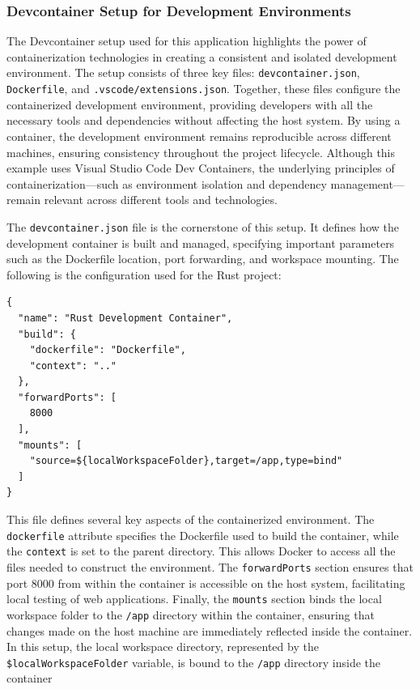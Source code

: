 \subsubsection{Devcontainer Setup for Development Environments}

The Devcontainer setup used for this application highlights the power of
containerization technologies in creating a consistent and isolated development
environment. The setup consists of three key files: \texttt{devcontainer.json},
\texttt{Dockerfile}, and \texttt{.vscode/extensions.json}. Together, these files
configure the containerized development environment, providing developers with all
the necessary tools and dependencies without affecting the host system. By using a
container, the development environment remains reproducible across different machines,
ensuring consistency throughout the project lifecycle. Although this example uses
Visual Studio Code Dev Containers, the underlying principles of containerization—such
as environment isolation and dependency management—remain relevant across different
tools and technologies.

The \texttt{devcontainer.json} file is the cornerstone of this setup. It defines
how the development container is built and managed, specifying important parameters
such as the Dockerfile location, port forwarding, and workspace mounting. The following
is the configuration used for the Rust project:

\begin{lstlisting}[caption={devcontainer.json Configuration}]
{
  "name": "Rust Development Container",
  "build": {
    "dockerfile": "Dockerfile",
    "context": ".."
  },
  "forwardPorts": [
    8000
  ],
  "mounts": [
    "source=${localWorkspaceFolder},target=/app,type=bind"
  ]
}
\end{lstlisting}


This file defines several key aspects of the containerized environment. The
\texttt{dockerfile} attribute specifies the Dockerfile used to build the container,
while the \texttt{context} is set to the parent directory. This allows Docker to
access all the files needed to construct the environment. The \texttt{forwardPorts}
section ensures that port 8000 from within the container is accessible on the host
system, facilitating local testing of web applications. Finally, the \texttt{mounts}
section binds the local workspace folder to the \texttt{/app} directory within the
container, ensuring that changes made on the host machine are immediately reflected
inside the container. In this setup, the local workspace directory, represented
by the \texttt{\${localWorkspaceFolder}} variable, is bound to the \texttt{/app}
directory inside the container

